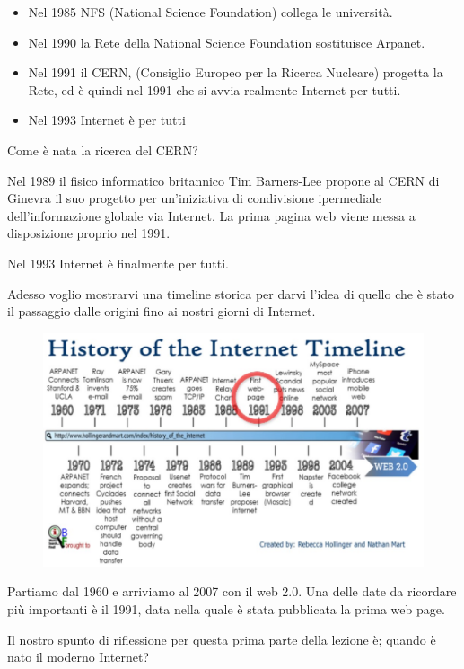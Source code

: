 \begin{itemize}
    \item Nel 1985 NFS (National Science Foundation) collega le università. 
    \item Nel 1990 la Rete della National Science Foundation sostituisce Arpanet.
    \item Nel 1991 il CERN, (Consiglio Europeo per la Ricerca Nucleare) progetta la Rete, ed è quindi nel 1991 che si avvia realmente Internet per tutti. 
    \item Nel 1993 Internet è per tutti
\end{itemize}
  
     Come è nata la  ricerca del CERN? \par
     Nel 1989 il fisico informatico britannico Tim Barners-Lee propone al CERN di Ginevra il suo progetto per un'iniziativa di condivisione ipermediale dell'informazione globale via Internet. La prima pagina web viene messa a disposizione proprio nel 1991. \par 
     Nel 1993 Internet è finalmente per tutti. \par
     Adesso voglio mostrarvi una timeline storica per darvi l'idea di quello che è stato il passaggio dalle origini fino ai nostri giorni di Internet. \par
     \begin{figure}[h]
         \centering
         \includegraphics[width=0.9\linewidth]{images/03_lez_fig_01.jpg}
     \end{figure}
     
     Partiamo dal 1960 e arriviamo al 2007 con il web 2.0. Una delle date da ricordare più importanti è il 1991, data nella quale è stata pubblicata la prima web page.\par
     
     Il nostro spunto di riflessione per questa prima parte della lezione è; quando è nato il moderno Internet? \par
     
